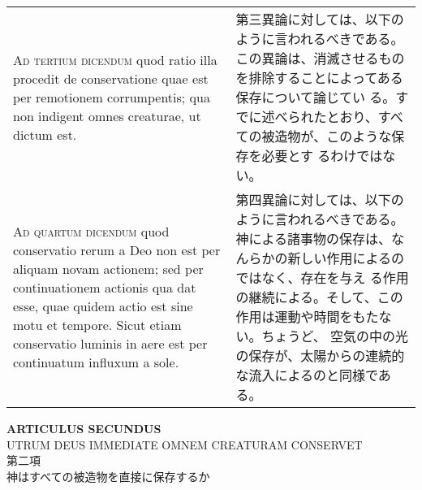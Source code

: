 \documentclass[10pt]{jsarticle} %
\begin{document}
\begin{longtable}{p{21em}p{21em}}
\\


{\scshape Ad tertium dicendum} quod ratio illa procedit
de conservatione quae est per remotionem corrumpentis; qua non indigent
omnes creaturae, ut dictum est.

&

第三異論に対しては、以下のように言われるべきである。
この異論は、消滅させるものを排除することによってある保存について論じてい
 る。すでに述べられたとおり、すべての被造物が、このような保存を必要とす
 るわけではない。

\\


{\scshape Ad quartum dicendum} quod conservatio rerum a
Deo non est per aliquam novam actionem; sed per continuationem actionis
qua dat esse, quae quidem actio est sine motu et tempore. Sicut etiam
conservatio luminis in aere est per continuatum influxum a sole.

&

第四異論に対しては、以下のように言われるべきである。
神による諸事物の保存は、なんらかの新しい作用によるのではなく、存在を与え
 る作用の継続による。そして、この作用は運動や時間をもたない。ちょうど、
 空気の中の光の保存が、太陽からの連続的な流入によるのと同様である。


\end{longtable}
\newpage

\begin{center}
 {\Large {\bf ARTICULUS SECUNDUS}}\\
 {\large UTRUM DEUS IMMEDIATE OMNEM CREATURAM CONSERVET}\\
 {\Large 第二項\\神はすべての被造物を直接に保存するか}
\end{center}
\end{document}
